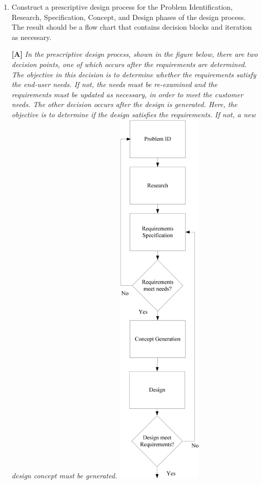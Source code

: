 \begin{enumerate}
\item
  Construct a prescriptive design process for the Problem
  Identification, Research, Specification, Concept, and Design phases of
  the design process. The result should be a flow chart that contains
  decision blocks and iteration as necessary.
  
\begin{onlysolution}
\textbf{[A]}
\itshape
In the prescriptive design process, shown in the figure below, there are two decision points,
one of which occurs after the requirements are determined. The objective in this decision is
to determine whether the requirements satisfy the end-user needs. If not, the needs must be
re-examined and the requirements must be updated as necessary, in order to meet the
customer needs. The other decision occurs after the design is generated. Here, the objective
is to determine if the design satisfies the requirements. If not, a new design concept must be
generated.
\includegraphics[width=1.6in,height=7.3in]{./chapter01/FigSolutions/image19}
\end{onlysolution}
  

\end{enumerate}

